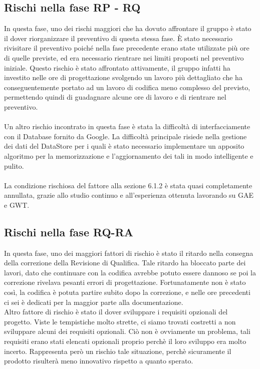 \subsection{Rischi nella fase RP - RQ}
In questa fase, uno dei rischi maggiori che ha dovuto affrontare il gruppo \`e
stato il dover riorganizzare il preventivo di questa stessa fase. \`E stato
necessario rivisitare il preventivo poich\'e nella fase precedente erano state
utilizzate pi\`u ore di quelle previste, ed era necessario rientrare nei
limiti proposti nel preventivo iniziale. Questo rischio \`e stato affrontato attivamente, 
il gruppo infatti ha investito nelle ore di progettazione svolgendo un lavoro
pi\`u dettagliato che ha conseguentemente portato ad un lavoro di codifica meno
complesso del previsto, permettendo quindi di guadagnare alcune ore di lavoro e
di rientrare nel preventivo.\\
\\
Un altro rischio incontrato in questa fase \`e stata la difficolt\`a di
interfacciamente con il Database fornito da Google. La difficolt\`a principale
risiede nella gestione dei dati del DataStore per i quali \`e stato necessario
implementare un apposito algoritmo per la memorizzazione e l'aggiornamento dei
tali in modo intelligente e pulito.\\
\\
La condizione rischiosa del fattore alla sezione 6.1.2 \`e stata quasi
completamente annullata, grazie allo studio continuo e
all'esperienza ottenuta lavorando su GAE e GWT.

\subsection{Rischi nella fase RQ-RA}
In questa fase, uno dei maggiori fattori di rischio \`e stato il ritardo nella
consegna della correzione della Revisione di Qualifica. Tale ritardo ha bloccato
parte dei lavori, dato che continuare con la codifica avrebbe potuto essere
dannoso se poi la correzione rivelava pesanti errori di progettazione.
Fortunatamente non \`e stato cos\`i, la codifica \`e potuta partire subito dopo
la correzione, e nelle ore precedenti ci sei \`e dedicati per la maggior parte
alla documentazione.\\
Altro fattore di rischio \`e stato il dover sviluppare i requisiti opzionali del
progetto. Viste le tempistiche molto strette, ci siamo trovati costretti a non
sviluppare alcuni dei requisiti opzionali. Ci\`o non \`e ovviamente un problema,
tali requisiti erano stati elencati opzionali proprio perch\`e il loro sviluppo
era molto incerto. Rappresenta per\`o un rischio tale situazione, perch\`e
sicuramente il prodotto risulter\`a meno innovativo rispetto a quanto sperato.


